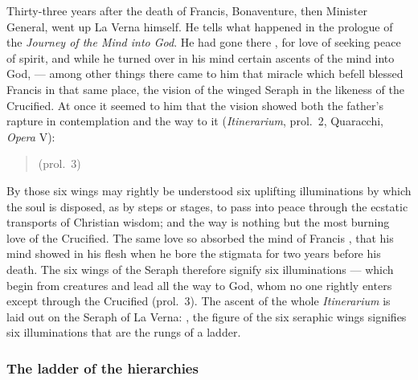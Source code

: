 Thirty-three years after the death of Francis, Bonaventure, then Minister
General, went up La Verna himself. He tells what happened in the prologue of
the \emph{Journey of the Mind into God}. He had gone there , for love of seeking peace of spirit, and while he
turned over in his mind certain ascents of the mind into God,  --- among
other things there came to him that miracle which befell blessed Francis in
that same place, the vision of the winged Seraph in the likeness of the
Crucified. At once it seemed to him that the vision showed both the
father's rapture in contemplation and the way to it (\emph{Itinerarium},
prol.~2, Quaracchi, \emph{Opera} V):
\begin{quote}
(prol.~3)
\end{quote}
By those six wings may rightly be understood six uplifting illuminations by
which the soul is disposed, as by steps or stages, to pass into peace
through the ecstatic transports of Christian wisdom; and the way is nothing
but the most burning love of the Crucified. The same love so absorbed the
mind of Francis , that his mind showed in
his flesh when he bore the stigmata for two years before his death. The six
wings of the Seraph therefore signify six illuminations  --- which begin from creatures and lead all the way to
God, whom no one rightly enters except through the Crucified (prol.~3). The
ascent of the whole \emph{Itinerarium} is laid out on the Seraph of La
Verna: , the figure of the six seraphic wings signifies six
illuminations that are the rungs of a ladder.

\subsubsection{The ladder of the hierarchies}

